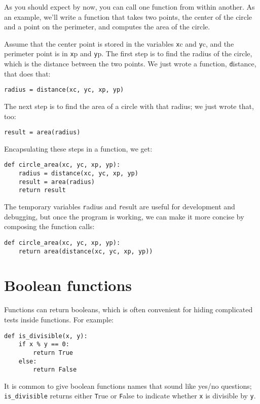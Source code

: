 \documentclass[
DIV=11,
fontsize=12,
twoside,
headinclude=false,
titlepage=firstiscover,
abstract=true,
headsepline=true,
footsepline=true,
chapterprefix=true, %
headings=big,
bibliography=totoc,%
captions=tableheading
]{scrbook}
\theoremstyle{definition}
\begin{document}
As you should expect by now, you can call one function from within
another.  As an example, we'll write a function that takes two points,
the center of the circle and a point on the perimeter, and computes
the area of the circle.

Assume that the center point is stored in the variables {\texttt xc} and
{\texttt yc}, and the perimeter point is in {\texttt xp} and {\texttt yp}. The
first step is to find the radius of the circle, which is the distance
between the two points.  We just wrote a function, {\texttt
distance}, that does that:

\begin{lstlisting}
radius = distance(xc, yc, xp, yp)
\end{lstlisting}
%
The next step is to find the area of a circle with that radius;
we just wrote that, too:

\begin{lstlisting}
result = area(radius)
\end{lstlisting}
%
Encapsulating these steps in a function, we get:

\begin{lstlisting}
def circle_area(xc, yc, xp, yp):
    radius = distance(xc, yc, xp, yp)
    result = area(radius)
    return result
\end{lstlisting}
%
The temporary variables {\texttt radius} and {\texttt result} are useful for
development and debugging, but once the program is working, we can
make it more concise by composing the function calls:

\begin{lstlisting}
def circle_area(xc, yc, xp, yp):
    return area(distance(xc, yc, xp, yp))
\end{lstlisting}
%

\section{Boolean functions}
\label{boolean}

Functions can return booleans, which is often convenient for hiding
complicated tests inside functions.  
For example:

\begin{lstlisting}
def is_divisible(x, y):
    if x % y == 0:
        return True
    else:
        return False
\end{lstlisting}
%
It is common to give boolean functions names that sound like yes/no
questions; \verb"is_divisible" returns either {\texttt True} or {\texttt False}
to indicate whether {\texttt x} is divisible by {\texttt y}.
\end{document}
